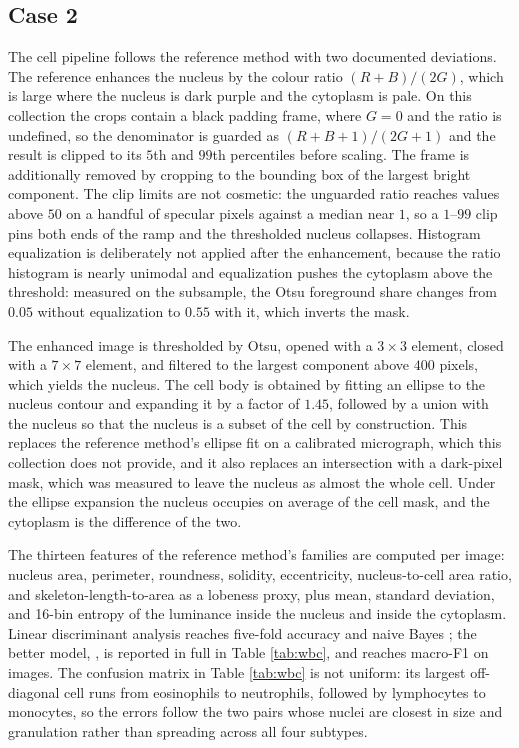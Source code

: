 \documentclass{ieeeaccess}
\begin{document}
\subsection{Case 2}
\label{sec:case2}
The cell pipeline follows the reference method \cite{prinyakupt2015} with two
documented deviations. The reference enhances the nucleus by the colour ratio
$(R+B)/(2G)$, which is large where the nucleus is dark purple and the cytoplasm
is pale. On this collection the crops contain a black padding frame, where
$G=0$ and the ratio is undefined, so the denominator is guarded as
$(R+B+1)/(2G+1)$ and the result is clipped to its $5$th and $99$th percentiles
before scaling. The frame is additionally removed by cropping to the bounding
box of the largest bright component. The clip limits are not cosmetic: the
unguarded ratio reaches values above $50$ on a handful of specular pixels
against a median near $1$, so a $1$--$99$ clip pins both ends of the ramp and
the thresholded nucleus collapses. Histogram equalization is deliberately not
applied after the enhancement, because the ratio histogram is nearly unimodal
and equalization pushes the cytoplasm above the threshold: measured on the
subsample, the Otsu foreground share changes from $0.05$ without equalization to
$0.55$ with it, which inverts the mask.

The enhanced image is thresholded by Otsu, opened with a $3\times3$ element,
closed with a $7\times7$ element, and filtered to the largest component above
$400$ pixels, which yields the nucleus. The cell body is obtained by fitting an
ellipse to the nucleus contour and expanding it by a factor of $1.45$, followed
by a union with the nucleus so that the nucleus is a subset of the cell by
construction. This replaces the reference method's ellipse fit on a calibrated
micrograph, which this collection does not provide, and it also replaces an
intersection with a dark-pixel mask, which was measured to leave the nucleus as
almost the whole cell. Under the ellipse expansion the nucleus occupies on
average \wbcNucleusShare{} of the cell mask, and the cytoplasm is the difference
of the two.

The thirteen features of the reference method's families are computed per image:
nucleus area, perimeter, roundness, solidity, eccentricity, nucleus-to-cell area
ratio, and skeleton-length-to-area as a lobeness proxy, plus mean, standard
deviation, and 16-bin entropy of the luminance inside the nucleus and inside the
cytoplasm. Linear discriminant analysis reaches \wbcLDA{} five-fold accuracy and
naive Bayes \wbcNB{}; the better model, \wbcBest{}, is reported in full in
Table \ref{tab:wbc}, and reaches macro-F1 \wbcFone{} on \wbcImages{} images.
The confusion matrix in Table \ref{tab:wbc} is not uniform: its largest off-diagonal cell runs from eosinophils to neutrophils, followed by lymphocytes to monocytes, so the errors follow the two pairs whose nuclei are closest in size and granulation rather than spreading across all four subtypes.
\end{document}
